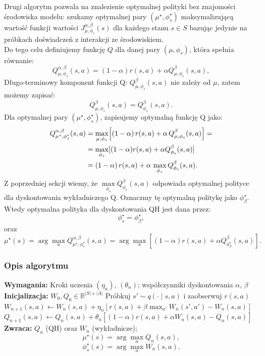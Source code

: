 Drugi algorytm pozwala na znalezienie optymalnej polityki bez znajomości środowiska modelu: szukamy optymalnej pary $(\mu^\star, \phi_s^\star)$ maksymalizującą wartość funkcji wartości $J^{\alpha, \beta}_{\mu, \phi_s}(s)$ dla każdego stanu $s \in S$ bazując jedynie na próbkach doświadczeń z interakcji ze środowiskiem.\\
Do tego celu definiujemy funkcję $Q$ dla danej pary $(\mu, \phi_s)$, która spełnia równanie:
\begin{equation}
Q^{\alpha, \beta}_{\mu, \phi_s}(s,a) = (1-\alpha) r(s,a) + \alpha Q^{\beta}_{\mu,\phi_s}(s,a),
\end{equation}
Długo-terminowy komponent funkcji Q: $Q^{\beta}_{\mu,\phi_s}(s,a)$ nie zależy od $\mu$, zatem możemy zapisać:
\[
Q^{\beta}_{\mu,\phi_s}(s,a) = Q^{\beta}_{\phi_s}(s,a).
\]
Dla optymalnej pary $(\mu^\star, \phi_s^\star)$, zapisujemy optymalną funkcję Q jako:
\begin{equation}
\begin{aligned}
Q^{\alpha,\beta}_{\mu^\star,\phi_s^\star}(s,a)
&= \max_{\mu,\phi_s}\Bigl[(1-\alpha)\,r(s,a) + \alpha\,Q^{\beta}_{\mu,\phi_s}(s,a)\Bigr] =\\
&=  \max\limits_{\phi_s}[(1-\alpha)r(s,a) + \alpha Q^\beta_{\phi_s}(s,a)] \\
&= (1-\alpha)\,r(s,a) + \alpha\,\max_{\phi_s} Q^{\beta}_{\phi_s}(s,a).
\end{aligned}
\end{equation}
 Z poprzedniej sekcji wiemy, że $\max\limits_{\phi_s} Q^{\beta}_{\phi_s}(s,a)$ odpowiada optymalnej polityce dla dyskontowania wykładniczego Q. Oznaczmy tę optymalną politykę jako $\phi^\star_\beta$. Wtedy optymalna polityka dla dyskontowania QH jest dana przez:
\[ \phi_s^\star = \phi^\star_\beta, \]
oraz
\[
\mu^\star(s) = \arg\max\limits_a Q^{\alpha, \beta}_{\mu^\star, \phi_s^\star}(s,a) = \arg\max\limits_a \left[ (1-\alpha) r(s,a) + \alpha Q^{\beta}_{\phi^\star_\beta}(s,a) \right].
\]
\subsubsection{Opis algorytmu}

\begin{algorithm}[H]
\caption{Znajdowanie optymalnej polityki dla dyskontowania quasi-hiperbolicznego \cite{eshwar2025}}
\label{alg:qh-qlearning}
\begin{algorithmic}[1]
\STATE \textbf{Wymagania:} Kroki uczenia $(\eta_n)$, $(\theta_n)$; współczynniki dyskontowania $\alpha$, $\beta$
\STATE \textbf{Inicjalizacja:} $W_0, Q_0 \in \mathbb{R}^{|S| \times |A|}$
\STATE Próbkuj $s' \sim q(\cdot\mid s, a)$ i zaobserwuj $r(s, a)$
\STATE $W_{n+1}(s, a) \leftarrow W_n(s, a) + \eta_n \left[ r(s, a) + \beta \max_{a'} W_n(s', a') - W_n(s, a) \right]$
\STATE $Q_{n+1}(s, a) \leftarrow Q_n(s, a) + \theta_n \left[ (1 - \alpha) r(s, a) + \alpha W_n(s, a) - Q_n(s, a) \right]$
\ENDFOR
\ENDFOR
\STATE \textbf{Zwraca:} $Q_n$ (QH) oraz $W_n$ (wykładnicze); 
\[ \mu^\star(s) = \arg\max\limits_a Q_n(s, a), \]
\[ \phi_s^\star(s) = \arg\max\limits_a W_n(s, a). \]
\end{algorithmic}
\end{algorithm}

